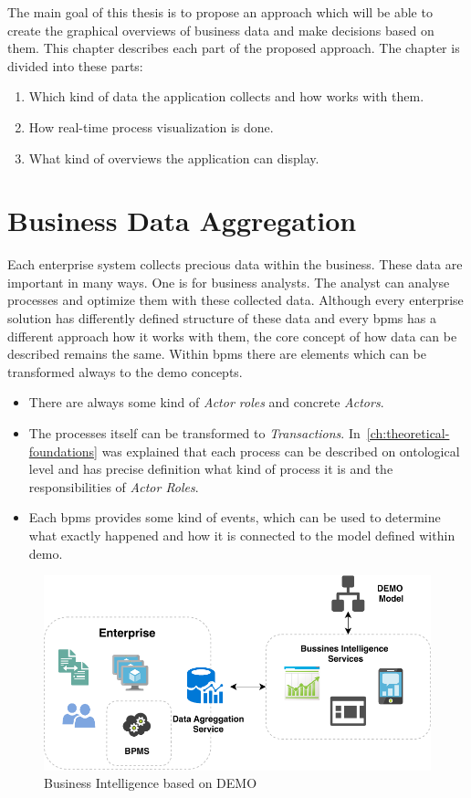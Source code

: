 The main goal of this thesis is to propose an approach which will be able to create the graphical overviews of business data and make decisions based on them. This chapter describes each part of the proposed approach. The chapter is divided into these parts:    
    \begin{enumerate}
      \item Which kind of data the application collects and how works with them.
      \item How real-time process visualization is done.
      \item What kind of overviews the application can display. 
    \end{enumerate}
\section{Business Data Aggregation}
Each enterprise system collects precious data within the business. These data are important in many ways. One is for business analysts. The analyst can analyse processes and optimize them with these collected data. Although every enterprise solution has differently defined structure of these data and every \gls{bpms} has a different approach how it works with them, the core concept of how data can be described remains the same. 
Within \gls{bpms} there are elements which can be transformed always to the \gls{demo} concepts.
\begin{itemize}
\item There are always some kind of \textit{Actor roles} and concrete \textit{Actors}.
\item The processes itself can be transformed to \textit{Transactions}. In~\cref{ch:theoretical-foundations} was explained that each process can be described on ontological level and has precise definition what kind of process it is and the responsibilities of \textit{Actor Roles}.
\item Each \gls{bpms} provides some kind of events, which can be used to determine what exactly happened and how it is connected to the model defined within \gls{demo}.
\end{itemize}

\begin{figure}[ht!]
  \centering
  \includegraphics[width=12cm,keepaspectratio]{img/bi-demo-overview}
  \caption{Business Intelligence based on DEMO}
  \label{fig:bi-demo-overview}
\end{figure}    

